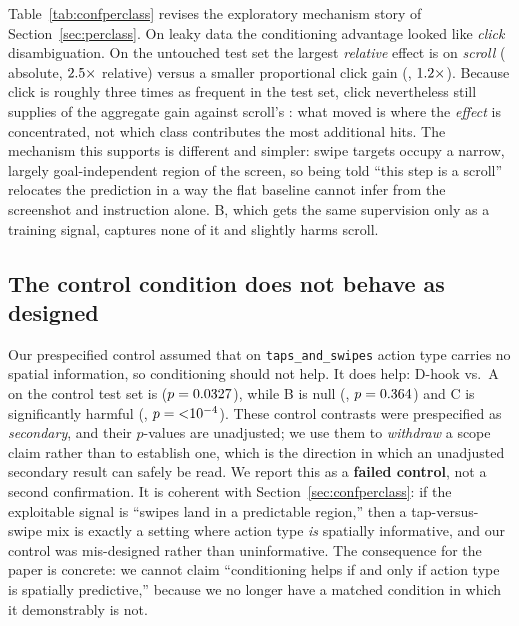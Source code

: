 Table~\ref{tab:confperclass} revises the exploratory mechanism story of
Section~\ref{sec:perclass}. On leaky data the conditioning advantage looked
like \emph{click} disambiguation. On the untouched test set the largest
\emph{relative} effect is on \emph{scroll} (\ConfScrollDelta{} absolute,
$2.5\times$ relative) versus a smaller proportional click gain
(\ConfClickDelta{}, $1.2\times$). Because click is roughly three
times as frequent in the test set, click nevertheless still supplies
\ConfClickAbsShare{} of the aggregate gain against scroll's
\ConfScrollAbsShare{}: what moved is where the \emph{effect} is
concentrated, not which class contributes the most additional hits. The
mechanism this supports is different and simpler: swipe targets occupy a
narrow, largely goal-independent region of the screen, so being told
``this step is a scroll'' relocates the prediction in a way the flat
baseline cannot infer from the screenshot and instruction alone. B, which
gets the same supervision only as a training signal, captures none of it
and slightly harms scroll.

\subsection{The control condition does not behave as designed}
\label{sec:controlfail}

Our prespecified control assumed that on \texttt{taps\_and\_swipes}
action type carries no spatial information, so conditioning should not
help. It does help: D-hook vs.\ A on the control test set is
\ConfCtrlDhvsA{} ($p=0.0327$), while B is null
(\ConfCtrlBvsA{}, $p=0.364$) and C is significantly harmful
(\ConfCtrlCvsA{}, $p={<}10^{-4}$). These control contrasts were
prespecified as \emph{secondary}, and their $p$-values are unadjusted; we
use them to \emph{withdraw} a scope claim rather than to establish one,
which is the direction in which an unadjusted secondary result can safely
be read. We report this as a \textbf{failed
control}, not a second confirmation. It is coherent with
Section~\ref{sec:confperclass}: if the exploitable signal is ``swipes land
in a predictable region,'' then a tap-versus-swipe mix is exactly a
setting where action type \emph{is} spatially informative, and our control
was mis-designed rather than uninformative. The consequence for the paper
is concrete: we cannot claim ``conditioning helps if and only if action
type is spatially predictive,'' because we no longer have a matched
condition in which it demonstrably is not.

